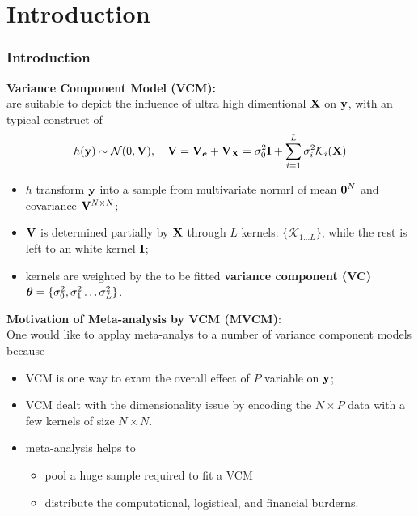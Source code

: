 \documentclass{beamer}
\begin{document}
\section{Introduction}
\begin{frame}
  \frametitle{Introduction} %
  \textbf{Variance Component Model (VCM):} \\
  are suitable to depict the influence of ultra high dimentional $\mathbf{X}$
  on $\mathbf{y}$, with an typical construct of
  \begin{align}\label{eq:vcm}
    h(\mathbf{y}) \sim \mathcal{N}(0, \mathbf{V}), \quad
    \mathbf{V} = \mathbf{V}_{\boldsymbol{e}} + \mathbf{V}_{\mathbf{X}} = \sigma^2_0 \textbf{I} + \sum_{i=1}^L
    \sigma^2_i \mathcal{K}_i(\mathbf{X})
  \end{align}
  \begin{itemize}
  \item $h$ transform $\mathbf{y}$ into a sample from multivariate normrl of
    mean $\boldsymbol{0}^N$ and covariance $\mathbf{V}^{N \times N}$;
  \item $\mathbf{V}$ is determined partially by $\mathbf{X}$ through $L$ kernels:
    $\{\mathcal{K}_{1 \dots L}\}$, while the rest is left to an white
    kernel $\textbf{I}$;
  \item kernels are weighted by the to be fitted \textbf{variance
      component (VC)}
    $\boldsymbol{\theta} = \{\sigma^2_0, \sigma^2_1 \dots \sigma^2_L\}$.
  \end{itemize}
\end{frame}
\begin{frame}
  \textbf{Motivation of Meta-analysis by VCM (MVCM)}: \\
  One would like to applay meta-analys to a number of variance
  component models because
  \begin{itemize}
  \item VCM is one way to exam the overall effect of $P$ variable on
    $\mathbf{y}$;
  \item VCM dealt with the dimensionality issue by encoding the
    $N \times P$ data with a few kernels of size $N \times N$.
  \item meta-analysis helps to
    \begin{itemize}
    \item pool a huge sample required to fit a VCM
    \item distribute the computational, logistical, and financial
      burderns.
    \end{itemize}
  \end{itemize}
\end{frame}
\end{document}
